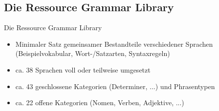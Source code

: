 \documentclass{beamer}
\begin{document}
\subsection{Die Ressource Grammar Library}
\begin{frame}{Die Ressource Grammar Library}
\begin{itemize}
  \item Minimaler Satz gemeinsamer Bestandteile verschiedener Sprachen (Beispielvokabular, Wort-/Satzarten, Syntaxregeln)
  \item ca. 38 Sprachen voll oder teilweise umgesetzt
  \item ca. 43 geschlossene Kategorien (Determiner, ...) und Phrasentypen
  \item ca. 22 offene Kategorien (Nomen, Verben, Adjektive, ...)
\end{itemize}
\end{frame}
\end{document}
